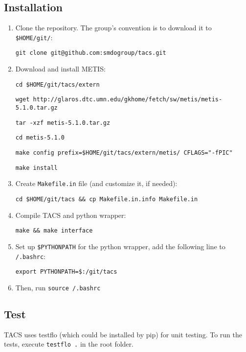 \documentclass{article}
\begin{document}
\subsection{Installation}

\begin{enumerate}
    \item Clone the repository. The group's convention is to download it to
    \texttt{\$HOME/git/}:

    \texttt{git clone git@github.com:smdogroup/tacs.git}

    \item Download and install METIS:

    \texttt{cd \$HOME/git/tacs/extern}

    \texttt{wget http://glaros.dtc.umn.edu/gkhome/fetch/sw/metis/metis-5.1.0.tar.gz}

    \texttt{tar -xzf metis-5.1.0.tar.gz}

    \texttt{cd metis-5.1.0}

    \texttt{make config prefix=\$HOME/git/tacs/extern/metis/ CFLAGS="-fPIC"}

    \texttt{make install}

    \item Create \texttt{Makefile.in} file (and customize it, if needed):

    \texttt{cd \$HOME/git/tacs \&\& cp Makefile.in.info Makefile.in}

    \item Compile TACS and python wrapper:

    \texttt{make \&\& make interface}

    \item Set up \texttt{\$PYTHONPATH} for the python wrapper, add the following line to \texttt{\texttildelow/.bashrc}:

    \texttt{export PYTHONPATH=\$:\texttildelow/git/tacs}

    \item Then, run \texttt{source \texttildelow/.bashrc}

\end{enumerate}

\subsection{Test}

TACS uses testflo (which could be installed by pip) for unit testing.
To run the tests, execute \texttt{testflo .} in the root folder.
\end{document}
